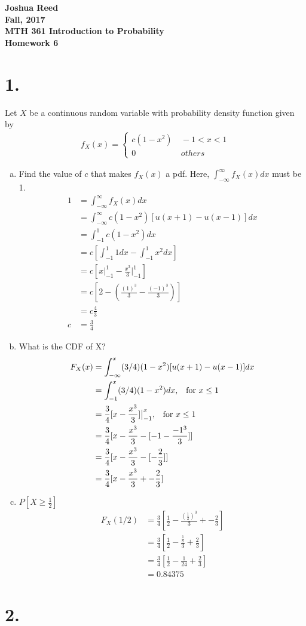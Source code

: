 \documentclass[12pt]{article}
\newcommand{\mysection}[1]{\section*{#1}}
\begin{document}
{\large \bfseries %
  Joshua Reed \\
  Fall, 2017 \\ \centering
  MTH 361 Introduction to Probability\\
  {\huge Homework 6\\}}
  

\mysection{1.}
Let $X$ be a continuous random variable with probability density function given by
  \begin{align*}
    f_X(x)=
    \begin{cases}
      c(1-x^2) &\ -1<x<1\\
      0        &\ others
    \end{cases}
  \end{align*}

\begin{enumerate}[(a)]
  \item Find the value of $c$ that makes $f_X(x)$ a pdf.
    Here, $\int_{-\infty}^{\infty}f_X(x)dx$ must be 1.
    \begin{align*}
      1&=\int_{-\infty}^{\infty}f_X(x)dx\\
       &=\int_{-\infty}^{\infty}c(1-x^2)[u(x+1)-u(x-1)]dx\\
       &=\int_{-1}^{1}c(1-x^2)dx\\
       &=c[\int_{-1}^{1}1dx-\int_{-1}^1 x^2dx]\\
       &=c[x\big|_{-1}^1 - \frac{x^3}{3}\big|_{-1}^1]\\
       &=c[2 - (\frac{{(1)}^3}{3}-\frac{{(-1)}^3}{3})]\\
       &=c\frac{4}{3}\\
      c&=\frac{3}{4}
    \end{align*}
    \newpage
  \item What is the CDF of X?\\
    \begin{align*}
      F_X(x)&=\int_{-\infty}^{x}(3/4)(1-x^2)[u(x+1)-u(x-1)]dx\\
            &=\int_{-1}^{x}(3/4)(1-x^2)dx\text{,\quad for } x\leq1\\
            &=\frac{3}{4}[x-\frac{x^3}{3}]\big|_{-1}^{x}\text{,\quad for } x\leq1\\
            &=\frac{3}{4}[x-\frac{x^3}{3}-[-1-\frac{-1^3}{3}]]\\
            &=\frac{3}{4}[x-\frac{x^3}{3}-[-\frac{2}{3}]]\\
            &=\frac{3}{4}[x-\frac{x^3}{3}+-\frac{2}{3}]\\
    \end{align*}
  \item $P[X\geq\frac{1}{2}]$\\
    \begin{align*}
      F_X(1/2) &=\frac{3}{4}[\frac{1}{2}-\frac{{(\frac{1}{2})}^3}{3}+-\frac{2}{3}]\\
               &=\frac{3}{4}[\frac{1}{2}-\frac{\frac{1}{8}}{3}+\frac{2}{3}]\\
               &=\frac{3}{4}[\frac{1}{2}-\frac{1}{24}+\frac{2}{3}]\\
               &=0.84375
    \end{align*}
\end{enumerate} 
\newpage

\mysection{2.}
\end{document}
